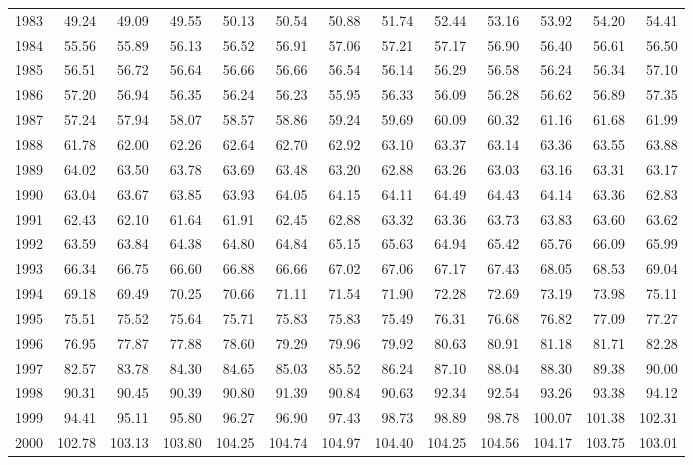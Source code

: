 \begin{longtable}{rrrrrrrrrrrrr}
  1983 & 49.24 & 49.09 & 49.55 & 50.13 & 50.54 & 50.88 & 51.74 & 52.44 & 53.16 & 53.92 & 54.20 & 54.41 \\ 
  1984 & 55.56 & 55.89 & 56.13 & 56.52 & 56.91 & 57.06 & 57.21 & 57.17 & 56.90 & 56.40 & 56.61 & 56.50 \\ 
  1985 & 56.51 & 56.72 & 56.64 & 56.66 & 56.66 & 56.54 & 56.14 & 56.29 & 56.58 & 56.24 & 56.34 & 57.10 \\ 
  1986 & 57.20 & 56.94 & 56.35 & 56.24 & 56.23 & 55.95 & 56.33 & 56.09 & 56.28 & 56.62 & 56.89 & 57.35 \\ 
  1987 & 57.24 & 57.94 & 58.07 & 58.57 & 58.86 & 59.24 & 59.69 & 60.09 & 60.32 & 61.16 & 61.68 & 61.99 \\ 
  1988 & 61.78 & 62.00 & 62.26 & 62.64 & 62.70 & 62.92 & 63.10 & 63.37 & 63.14 & 63.36 & 63.55 & 63.88 \\ 
  1989 & 64.02 & 63.50 & 63.78 & 63.69 & 63.48 & 63.20 & 62.88 & 63.26 & 63.03 & 63.16 & 63.31 & 63.17 \\ 
  1990 & 63.04 & 63.67 & 63.85 & 63.93 & 64.05 & 64.15 & 64.11 & 64.49 & 64.43 & 64.14 & 63.36 & 62.83 \\ 
  1991 & 62.43 & 62.10 & 61.64 & 61.91 & 62.45 & 62.88 & 63.32 & 63.36 & 63.73 & 63.83 & 63.60 & 63.62 \\ 
  1992 & 63.59 & 63.84 & 64.38 & 64.80 & 64.84 & 65.15 & 65.63 & 64.94 & 65.42 & 65.76 & 66.09 & 65.99 \\ 
  1993 & 66.34 & 66.75 & 66.60 & 66.88 & 66.66 & 67.02 & 67.06 & 67.17 & 67.43 & 68.05 & 68.53 & 69.04 \\ 
  1994 & 69.18 & 69.49 & 70.25 & 70.66 & 71.11 & 71.54 & 71.90 & 72.28 & 72.69 & 73.19 & 73.98 & 75.11 \\ 
  1995 & 75.51 & 75.52 & 75.64 & 75.71 & 75.83 & 75.83 & 75.49 & 76.31 & 76.68 & 76.82 & 77.09 & 77.27 \\ 
  1996 & 76.95 & 77.87 & 77.88 & 78.60 & 79.29 & 79.96 & 79.92 & 80.63 & 80.91 & 81.18 & 81.71 & 82.28 \\ 
  1997 & 82.57 & 83.78 & 84.30 & 84.65 & 85.03 & 85.52 & 86.24 & 87.10 & 88.04 & 88.30 & 89.38 & 90.00 \\ 
  1998 & 90.31 & 90.45 & 90.39 & 90.80 & 91.39 & 90.84 & 90.63 & 92.34 & 92.54 & 93.26 & 93.38 & 94.12 \\ 
  1999 & 94.41 & 95.11 & 95.80 & 96.27 & 96.90 & 97.43 & 98.73 & 98.89 & 98.78 & 100.07 & 101.38 & 102.31 \\ 
  2000 & 102.78 & 103.13 & 103.80 & 104.25 & 104.74 & 104.97 & 104.40 & 104.25 & 104.56 & 104.17 & 103.75 & 103.01 \\ 

\end{longtable}
